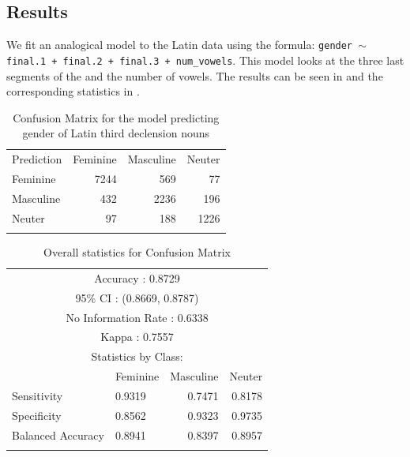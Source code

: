 \subsection{Results}

We fit an analogical model to the Latin data using the formula: \texttt{gender $\sim$ final.1\- + final.2 + final.3 + num\_vowels}. This model looks at the three last segments of the  and the number of vowels. The results can be seen in  and the corresponding statistics in .

\begin{table}
  \centering
  \begin{tabular}{lrrr}
    \lsptoprule
    \multicolumn{4}{c}{Reference}                  \\
    \midrule
    Prediction     & Feminine & Masculine & Neuter \\
         Feminine  & 7244     & 569       & 77     \\
         Masculine & 432      & 2236      & 196    \\
         Neuter    & 97       & 188       & 1226   \\
    \lspbottomrule
  \end{tabular}
  \caption{Confusion Matrix for the model predicting gender of Latin third declension nouns}\label{tab:gender-lat}
\end{table}

\begin{table}
  \centering
  \begin{tabular}{llrr}
    \lsptoprule
    \multicolumn{4}{c}{Overall statistics:} \\

    \midrule
    \multicolumn{4}{c}{Accuracy : 0.8729}             \\
    \multicolumn{4}{c}{95\% CI : (0.8669, 0.8787)}    \\
    \multicolumn{4}{c}{No Information Rate : 0.6338}  \\
    \multicolumn{4}{c}{Kappa : 0.7557}                \\
    \midrule
    \multicolumn{4}{c}{Statistics by Class:}          \\
    \midrule
                      & Feminine & Masculine & Neuter \\
    Sensitivity       & 0.9319   & 0.7471    & 0.8178 \\
    Specificity       & 0.8562   & 0.9323    & 0.9735 \\
    Balanced Accuracy & 0.8941   & 0.8397    & 0.8957 \\
    \lspbottomrule
  \end{tabular}
  \caption{Overall statistics for Confusion Matrix }\label{tab:gender-lat-stats}
\end{table}


